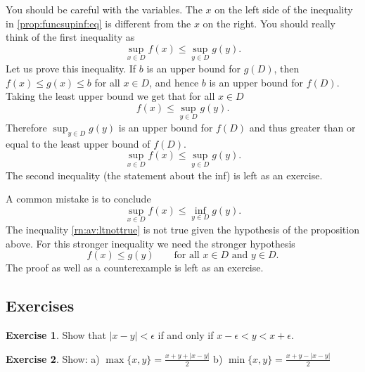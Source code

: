 \documentclass[12pt]{book}
\newcommand{\abs}[1]{\left\lvert {#1} \right\rvert}
\theoremstyle{plain}
\theoremstyle{remark}
\theoremstyle{definition}
\theoremstyle{exercise}
\newtheorem{exercise}{Exercise}[section]
\theoremstyle{example}
\begin{document}
You should be careful with the variables.  The $x$ on the left side of
the inequality in \eqref{prop:funcsupinf:eq}
is different from the $x$ on the right.  You
should really think of the first inequality as
\begin{equation*}
\sup_{x \in D} f(x) \leq \sup_{y \in D} g(y) .
\end{equation*}
Let us prove this inequality.  If $b$ is an upper bound for $g(D)$, then
$f(x) \leq g(x) \leq b$ for all $x \in D$, and hence $b$ is an upper bound for $f(D)$.
Taking the least upper bound we get that for all $x \in D$
\begin{equation*}
f(x) \leq \sup_{y \in D} g(y) .
\end{equation*}
Therefore
$\sup_{y \in D} g(y)$ is an upper bound for $f(D)$ and thus greater than or
equal to the least upper bound of $f(D)$.
\begin{equation*}
\sup_{x \in D} f(x) \leq \sup_{y \in D} g(y) .
\end{equation*}
The second inequality (the statement about the inf) is left as an exercise.

\medskip

A common mistake is to conclude 
\begin{equation} \label{rn:av:ltnottrue}
\sup_{x \in D} f(x) \leq \inf_{y \in D} g(y) .
\end{equation}
The inequality \eqref{rn:av:ltnottrue} is not true given the hypothesis of
the proposition above.  For this stronger
inequality we need the stronger hypothesis
\begin{equation*}
f(x) \leq g(y) \qquad \text{for all $x \in D$ and $y \in D$.}
\end{equation*}
The proof as well as a counterexample is left as an exercise.

\subsection{Exercises}

\begin{exercise}
Show that
$\abs{x-y} < \epsilon$ if and only if $x-\epsilon < y < x+\epsilon$.
\end{exercise}

\begin{exercise}
Show: \qquad
a)
$\max \{x,y\} = \frac{x+y+\abs{x-y}}{2}$
\qquad
b)
$\min \{x,y\} = \frac{x+y-\abs{x-y}}{2}$
\end{exercise}
\end{document}
